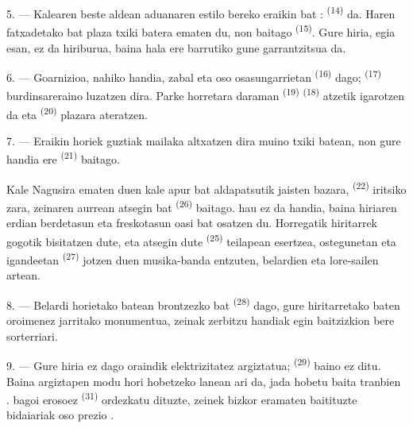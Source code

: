 5. --- Kalearen beste aldean aduanaren estilo bereko eraikin bat
:  \textsuperscript{(14)} da. Haren fatxadetako bat
plaza txiki batera ematen du, non  baitago
\textsuperscript{(15)}. Gure hiria, egia esan, ez da hiriburua, baina hala ere
barrutiko gune garrantzitsua da.

\VUsaut{5.0mm}
\VUsaut{3.4mm}

6. --- Goarnizioa, nahiko handia,  zabal eta oso osasungarrietan
\textsuperscript{(16)} dago;  \textsuperscript{(17)}
burdinsareraino luzatzen dira. Parke horretara daraman
 \textsuperscript{(19)} 
\textsuperscript{(18)} atzetik igarotzen da eta 
\textsuperscript{(20)} plazara ateratzen.

7. --- Eraikin horiek guztiak mailaka altxatzen dira muino txiki batean, non gure
 handia ere \textsuperscript{(21)} baitago.

Kale Nagusira ematen duen kale apur bat aldapatsutik jaisten bazara,
 \textsuperscript{(22)} iritsiko zara, zeinaren aurrean
 atsegin bat \textsuperscript{(26)} baitago. 
hau ez da handia, baina hiriaren erdian berdetasun eta freskotasun oasi bat
osatzen du. Horregatik hiritarrek gogotik bisitatzen dute, eta atsegin dute
 \textsuperscript{(25)} teilapean esertzea, ostegunetan eta
igandeetan  \textsuperscript{(27)} jotzen duen musika-banda
entzuten, belardien eta lore-sailen artean.

8. --- Belardi horietako batean brontzezko  bat
\textsuperscript{(28)} dago, gure hiritarretako baten oroimenez jarritako
monumentua, zeinak zerbitzu handiak egin baitzizkion bere sorterriari.

\VUsaut{4.0mm}
\VUsaut{3.4mm}

9. --- Gure hiria ez dago oraindik elektrizitatez argiztatua; 
\textsuperscript{(29)} baino ez ditu. Baina  argiztapen
modu hori hobetzeko lanean ari da,  jada hobetu baita tranbien
.   bagoi
  erosoez \textsuperscript{(31)}
ordezkatu dituzte, zeinek bizkor eramaten baitituzte bidaiariak
 oso prezio .

